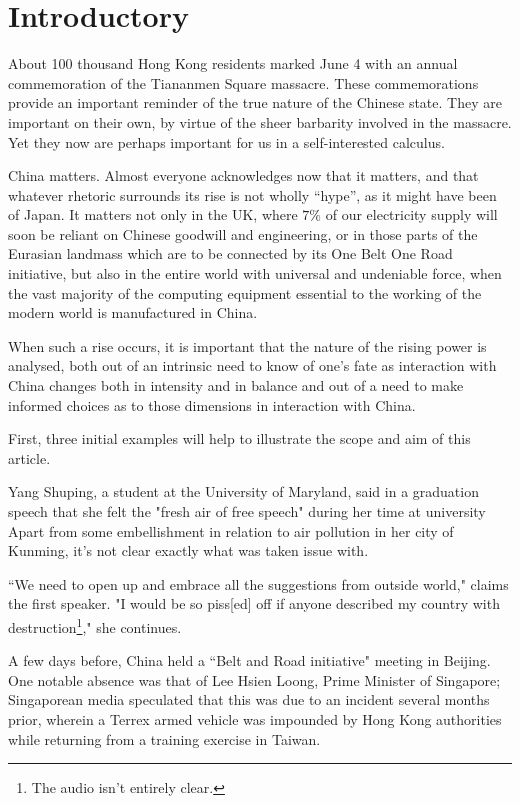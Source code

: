 \documentclass[10pt,a4paper,twocolumn]{article}
\newcounter{count}
\begin{document}
\section{Introductory}

About 100 thousand Hong Kong residents marked June 4 with an annual commemoration of the Tiananmen Square massacre. These commemorations provide an important reminder of the true nature of the Chinese state. They are important on their own, by virtue of the sheer barbarity involved in the massacre. Yet they now are perhaps important for us in a self-interested calculus.

China matters. Almost everyone acknowledges now that it matters, and that whatever rhetoric surrounds its rise is not wholly ``hype'', as it might have been of Japan. It matters not only in the UK, where $7\%$ of our electricity supply will soon be reliant on Chinese goodwill and engineering, or in those parts of the Eurasian landmass which are to be connected by its One Belt One Road initiative, but also in the entire world with universal and undeniable force, when the vast majority of the computing equipment essential to the working of the modern world is manufactured in China.

When such a rise occurs, it is important that the nature of the rising power is analysed, both out of an intrinsic need to know of one's fate as interaction with China changes both in intensity and in balance and out of a need to make informed choices as to those dimensions in interaction with China.

First, three initial examples will help to illustrate the scope and aim of this article.

Yang Shuping, a student at the University of Maryland, said in a graduation speech that she felt the "fresh air of free speech" during her time at university Apart from some embellishment in relation to air pollution in her city of Kunming, it's not clear exactly what was taken issue with.

``We need to open up and embrace all the suggestions from outside world," claims the first speaker. "I would be so piss[ed] off if anyone described my country with destruction\footnote{The audio isn't entirely clear.}," she continues.

A few days before, China held a ``Belt and Road initiative" meeting in Beijing. One notable absence was that of Lee Hsien Loong, Prime Minister of Singapore; Singaporean media speculated that this was due to an incident several months prior, wherein a Terrex armed vehicle was impounded by Hong Kong authorities while returning from a training exercise in Taiwan.
\end{document}
